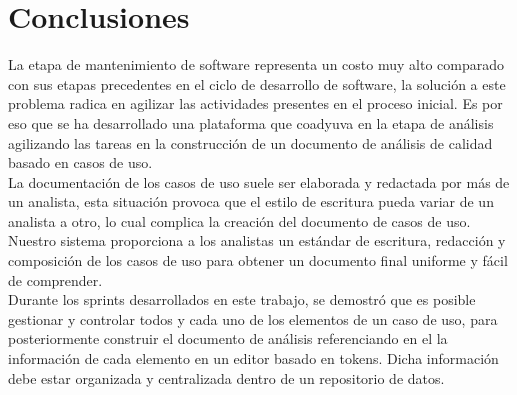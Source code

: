 \chapter{Conclusiones} \label{cap:diez}

La etapa de mantenimiento de software representa un costo muy alto comparado con sus etapas precedentes en el ciclo de desarrollo de software, la solución a este problema radica en agilizar las actividades presentes en el proceso inicial. Es por eso que se ha desarrollado una plataforma que coadyuva en la etapa de análisis agilizando las tareas en la construcción de un documento de análisis de calidad basado en casos de uso.\\

La documentación de los casos de uso suele ser elaborada y redactada por más de un analista, esta situación provoca que el estilo de escritura pueda variar de un analista a otro, lo cual complica la creación del documento de casos de uso. Nuestro sistema proporciona a los analistas un estándar de escritura, redacción y composición de los casos de uso para obtener un documento final uniforme y fácil de comprender.\\

Durante los sprints desarrollados en este trabajo, se demostró que es posible gestionar y controlar todos y cada uno de los elementos de un caso de uso, para posteriormente construir el documento de análisis referenciando en el la información de cada elemento en un editor basado en tokens. Dicha información debe estar organizada y centralizada dentro de un repositorio de datos.

